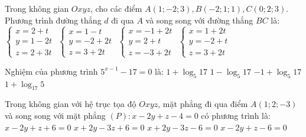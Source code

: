 \begin{ex}%
	Trong không gian $Oxyz$, cho các điểm $A(1; -2; 3), B(-2; 1; 1), C(0; 2; 3)$. Phương trình đường thẳng $d$ đi qua $A$ và song song với đường thẳng $BC$ là:
	\choice
	{$\begin{cases} x = 2 + t \\ y = 1 - 2t \\ z = 2 + 3t \end{cases}$}
	{$\begin{cases} x = 1 - t \\ y = -2 + 2t \\ z = 3 + 2t \end{cases}$}
	{$\begin{cases} x = -1 + 2t \\ y = 2 + t \\ z = -3 + 2t \end{cases}$}
	{\True $\begin{cases} x = 1 + 2t \\ y = -2 + t \\ z = 3 + 2t \end{cases}$}
\end{ex}

\begin{ex}%
	Nghiệm của phương trình $5^{x-1} - 17 = 0$ là:
	\choice
	{\True $1 + \log_5 17$}
	{$1 - \log_5 17$}
	{$-1 + \log_5 17$}
	{$1 + \log_{17} 5$}
\end{ex}

\begin{ex}%
	Trong không gian với hệ trục tọa độ $Oxyz$, mặt phẳng đi qua điểm $A(1; 2; -3)$ và song song với mặt phẳng $(P)\colon x - 2y + z - 4 = 0$ có phương trình là:
	\choice
	{\True $x - 2y + z + 6 = 0$}
	{$x + 2y - 3z + 6 = 0$}
	{$x + 2y - 3z - 6 = 0$}
	{$x - 2y + z - 6 = 0$}
\end{ex}


